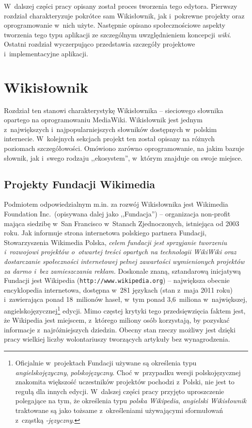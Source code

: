 \documentclass{pracamgr}
\begin{document}
W~dalszej części pracy opisany został proces tworzenia tego edytora. Pierwszy rozdział charakteryzuje pokrótce sam Wikisłownik, jak i~pokrewne projekty oraz oprogramowanie w~nich użyte. Następnie opisano społecznościowe aspekty tworzenia tego typu aplikacji ze szczególnym uwzględnieniem koncepcji \emph{wiki}. Ostatni rozdział wyczerpująco przedstawia szczegóły projektowe i~implementacyjne aplikacji.

\chapter{Wikisłownik}
Rozdział ten stanowi charakterystykę Wikisłownika -- sieciowego słownika opartego na oprogramowaniu MediaWiki. Wikisłownik jest jednym z~największych i~najpopularniejszych słowników dostępnych w~polskim internecie. W~kolejnych sekcjach projekt ten został opisany na różnych poziomach szczegółowości. Omówiono zarówno oprogramowanie, na jakim bazuje słownik, jak i~swego rodzaju ,,ekosystem'', w~którym znajduje on swoje miejsce.

\section{Projekty Fundacji Wikimedia}
Podmiotem odpowiedzialnym m.in. za rozwój Wikisłownika jest Wikimedia Foundation Inc.\ (opisywana dalej jako ,,Fundacja'') -- organizacja non-profit mająca siedzibę w~San Francisco w~Stanach Zjednoczonych, istniejąca od 2003 roku. Jak informuje strona internetowa polskiego partnera Fundacji, Stowarzyszenia Wikimedia Polska, \emph{celem fundacji jest sprzyjanie tworzeniu i~rozwojowi projektów o~otwartej treści opartych na technologii WikiWiki oraz dostarczanie społeczności internetowej pełnej zawartości wymienionych projektów za darmo i~bez zamieszczania reklam.} %
Doskonale znaną, sztandarową inicjatywą Fundacji jest Wikipedia (\texttt{http://www.wikipedia.org}) -- największa obecnie encyklopedia internetowa, dostępna w~281 językach (stan z~maja 2011 roku) i~zawierająca ponad 18~milionów haseł, w~tym ponad 3,6~miliona w~największej, angielskojęzycznej\footnote{Oficjalnie w~projektach Fundacji używane są określenia typu \emph{angielskojęzyczny}, \emph{polskojęzyczny}. Choć w~przypadku wersji polskojęzycznej znakomita większość uczestników projektów pochodzi z~Polski, nie jest to regułą dla innych edycji. W~dalszej części pracy przyjęto uproszczenie polegające na tym, że określenia typu \emph{polska Wikipedia}, \emph{angielski Wikisłownik} traktowane są jako tożsame z~określeniami używającymi sformułowań z~cząstką \emph{-języczny}.} edycji. Mimo częstej krytyki tego przedsięwzięcia faktem jest, że Wikipedia jest miejscem, z~którego miliony osób korzystają, by pozyskać informacje z~najróżniejszych dziedzin. Obecny stan rzeczy możliwy jest dzięki pracy wielkiej liczby wolontariuszy tworzących artykuły bez wynagrodzenia.
\end{document}
